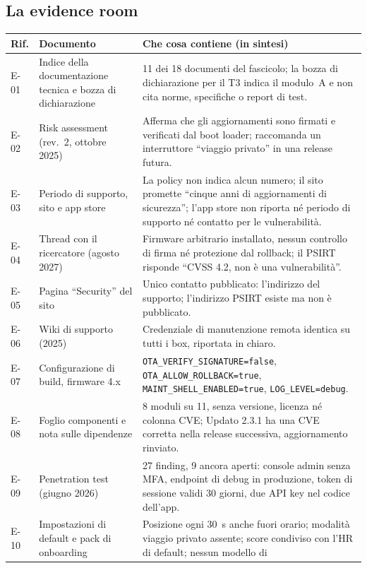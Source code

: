 \subsection{La evidence room}
{\small
\begin{longtable}{@{}l p{4.2cm} p{8.3cm}@{}}
\toprule
\textbf{Rif.} & \textbf{Documento} & \textbf{Che cosa contiene (in sintesi)} \\ \midrule
\endhead
E-01 & Indice della documentazione tecnica e bozza di dichiarazione & 11 dei 18 documenti del
  fascicolo; la bozza di dichiarazione per il T3 indica il modulo~A e non cita norme, specifiche o
  report di test. \\
E-02 & Risk assessment (rev.~2, ottobre 2025) & Afferma che gli aggiornamenti sono firmati e
  verificati dal boot loader; raccomanda un interruttore ``viaggio privato'' in una release futura. \\
E-03 & Periodo di supporto, sito e app store & La policy non indica alcun numero; il sito promette
  ``cinque anni di aggiornamenti di sicurezza''; l'app store non riporta né periodo di supporto né
  contatto per le vulnerabilità. \\
E-04 & Thread con il ricercatore (agosto 2027) & Firmware arbitrario installato, nessun controllo di
  firma né protezione dal rollback; il PSIRT risponde ``CVSS 4.2, non è una vulnerabilità''. \\
E-05 & Pagina ``Security'' del sito & Unico contatto pubblicato: l'indirizzo del supporto; l'indirizzo
  PSIRT esiste ma non è pubblicato. \\
E-06 & Wiki di supporto (2025) & Credenziale di manutenzione remota identica su tutti i box,
  riportata in chiaro. \\
E-07 & Configurazione di build, firmware 4.x & \texttt{OTA\_VERIFY\_SIGNATURE=false},
  \texttt{OTA\_ALLOW\_ROLLBACK=true}, \texttt{MAINT\_SHELL\_ENABLED=true},
  \texttt{LOG\_LEVEL=debug}. \\
E-08 & Foglio componenti e nota sulle dipendenze & 8 moduli su 11, senza versione, licenza né
  colonna CVE; Updato 2.3.1 ha una CVE corretta nella release successiva, aggiornamento rinviato. \\
E-09 & Penetration test (giugno 2026) & 27 finding, 9 ancora aperti: console admin senza MFA,
  endpoint di debug in produzione, token di sessione validi 30 giorni, due API key nel codice
  dell'app. \\
E-10 & Impostazioni di default e pack di onboarding & Posizione ogni 30~s anche fuori orario;
  modalità viaggio privato assente; score condiviso con l'HR di default; nessun modello di

\end{longtable}}
